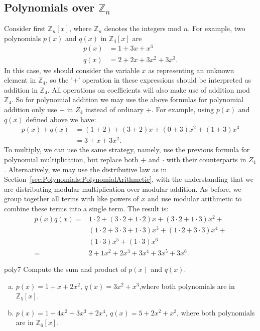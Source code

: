 \subsection*{Polynomials over $\mathbb{Z}_n$}
Consider first $\mathbb{Z}_n[x]$, where $\mathbb{Z}_n$ denotes the integers mod $n$. For example, two polynomials $p(x)$ and $q(x)$ in $\mathbb{Z}_4[x]$ are
\begin{align*} 
p(x) & = 1+3x+x^3\\
q(x) & = 2+2x+3x^2+3x^3.
\end{align*}
In this case, we should consider the variable $x$ as representing an unknown element in $\mathbb{Z}_4$, so the '+' operation in these expressions should be interpreted as addition in $\mathbb{Z}_4$. All operations on coefficients will also make use of addition mod $\mathbb{Z}_4$. So for polynomial addition we may use the above formulas for polynomial addition only use $+$ in $Z_4$ instead of ordinary $+$. For example, using $p(x)$ and $q(x)$ defined above we have: 
\begin{align*}
p(x) + q(x) &=(1+ 2)+(3+ 2)x+(0+ 3)x^2+ (1+ 3)x^3\\
&= 3+x+3x^2.
\end{align*}
To multiply, we can use the same strategy, namely, use the previous formula for polynomial multiplication, but replace both $+$ and $\cdot$ with their counterparts in $Z_4$. Alternatively,  we may use the distributive law as in Section~\ref{sec:Polynomials:PolynomialArithmetic}, with the understanding that we are distributing modular multiplication over modular addition. As before, we group together all terms with like powers of $x$ and use modular arithmetic to combine  these terms into a single term.  The result is:
\begin{align*}
p(x)  q(x)  =  &1\cdot 2+(3 \cdot 2 + 1 \cdot 2)x+(3 \cdot 2 +  1 \cdot 3)x^2+\\
&(1\cdot 2 + 3\cdot 3 +  1 \cdot 3)x^3+ (1\cdot 2 +  3\cdot 3)x^4 +\\
&(1 \cdot 3)x^5+ (1 \cdot 3)x^6\\
= &2+1x^2 + 2x^3+ 3x^4+ 3x^5+3x^6.
\end{align*}

\begin{exercise}{poly7}
Compute the sum and product of $p(x)$ and $q(x)$.
\begin{enumerate}[(a)]
\item
$p(x)=1+x+2x^2$, $q(x)=3x^2+x^3$,where both polynomials are in $\mathbb{Z}_5[x]$.
\item
$p(x)= 1+4x^2+3x^3+2x^4$, $q(x)=5+2x^2+x^3$, where both polynomials are in $\mathbb{Z}_6[x]$.
\end{enumerate}
\end{exercise}

